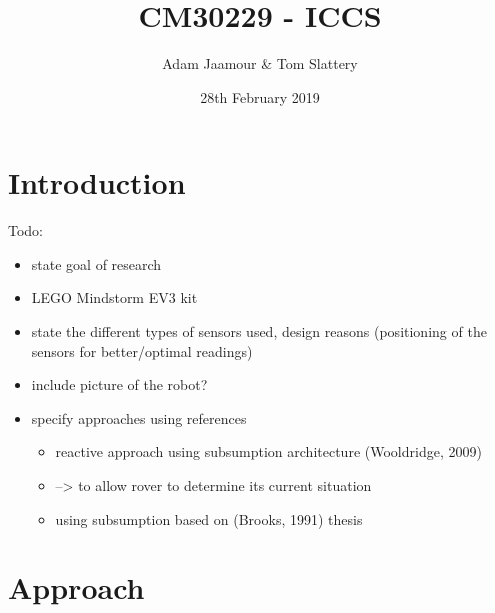 \documentclass[a4paper,12pt,twocolumn]{article}
\title{CM30229 - ICCS}
\author{Adam Jaamour & Tom Slattery}
\date{28th February 2019}
\begin{document}
\maketitle
\thispagestyle{empty}
\clearpage
\setcounter{page}{1}


\section{Introduction}

Todo:
\begin{itemize}
    \item state goal of research
    \item LEGO Mindstorm EV3 kit
    \item state the different types of sensors used, design reasons (positioning of the sensors for better/optimal readings)
    \item include picture of the robot?
    \item specify approaches using references
    \begin{itemize}
        \item reactive approach using subsumption architecture (Wooldridge, 2009)
        \item --> to allow rover to determine its current situation
        \item using subsumption based on (Brooks, 1991) thesis
    \end{itemize}
\end{itemize}


\section{Approach}
\end{document}
